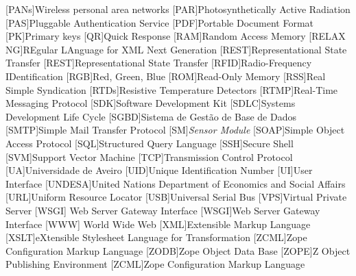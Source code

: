\begin{multicols}{2}
\begin{acronym}[RELAX NG]
	[PANs]{Wireless personal area networks}
	[PAR]{Photosynthetically Active Radiation}
	[PAS]{Pluggable Authentication Service}
	[PDF]{Portable Document Format}
	[PK]{Primary keys}
	[QR]{Quick Response}
	[RAM]{Random Access Memory}
	[RELAX NG]{REgular LAnguage for XML Next Generation}
	[REST]{Representational State Transfer}
	[REST]{Representational State Transfer}
	[RFID]{Radio-Frequency IDentification}
	[RGB]{Red, Green, Blue}
	[ROM]{Read-Only Memory}
	[RSS]{Real Simple Syndication}
	[RTDs]{Resistive Temperature Detectors}
	[RTMP]{Real-Time Messaging Protocol}
	[SDK]{Software Development Kit}
	[SDLC]{Systems Development Life Cycle}
	[SGBD]{Sistema de Gestão de Base de Dados}
	[SMTP]{Simple Mail Transfer Protocol}
	[SM]{\textit{Sensor Module}}
	[SOAP]{Simple Object Access Protocol}
	[SQL]{Structured Query Language}
	[SSH]{Secure Shell}
	[SVM]{Support Vector Machine}
	[TCP]{Transmission Control Protocol}
	[UA]{Universidade de Aveiro}
	[UID]{Unique Identification Number}
	[UI]{User Interface}
	[UNDESA]{United Nations Department of Economics and Social Affairs}
	[URL]{Uniform Resource Locator}
	[USB]{Universal Serial Bus}
	[VPS]{Virtual Private Server }
	[WSGI]{ Web Server Gateway Interface }
	[WSGI]{Web Server Gateway Interface}
	[WWW]{ World Wide Web}
	[XML]{Extensible Markup Language}
	[XSLT]{eXtensible Stylesheet Language for Transformation}
	[ZCML]{Zope Configuration Markup Language}
	[ZODB]{Zope Object Data Base}
	[ZOPE]{Z Object Publishing Environment}
	[ZCML]{Zope Configuration Markup Language}
	
	
\end{acronym}

\end{multicols}

